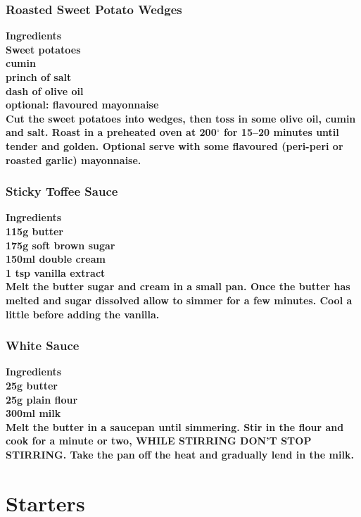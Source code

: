 \documentclass[18pt, oneside]{book}
\begin{document}
\section{Roasted Sweet Potato Wedges}
\bf{Ingredients} \normalfont \\
Sweet potatoes \\
cumin \\
princh of salt \\
dash of olive oil \\
optional: flavoured mayonnaise \\

Cut the sweet potatoes into wedges, then toss in some olive oil, cumin and salt. Roast in a preheated oven at 200$^{\circ}$ for 15--20 minutes until tender and golden. Optional serve with some flavoured (peri-peri or roasted garlic) mayonnaise. 



\section{Sticky Toffee Sauce}
\label{toffee}
\bf{Ingredients} \normalfont \\
115g butter \\
175g soft brown sugar \\
150ml double cream \\
1 tsp vanilla extract \\

Melt the butter sugar and cream in a small pan. Once the butter has melted and 
sugar dissolved allow to simmer for a few minutes. Cool a little before adding 
the vanilla. 

\section{White Sauce}
\bf{Ingredients} \normalfont \\
25g butter \\
25g plain flour \\
300ml milk \\

Melt the butter in a saucepan until simmering. Stir in the flour and cook for a minute or two, WHILE STIRRING DON'T STOP STIRRING. Take the pan off the heat and gradually lend in the milk. 

\part{Starters}
\setcounter{chapter}{1}
\end{document}
